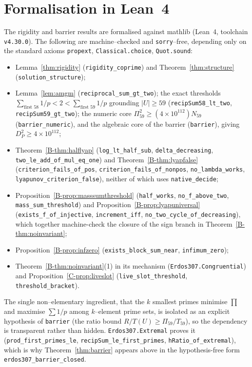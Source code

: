\documentclass[11pt]{article}
\theoremstyle{definition}
\begin{document}
\section{Formalisation in Lean~4}\label{sec:lean}

The rigidity and barrier results are formalised against mathlib (Lean~4, toolchain
\texttt{v4.30.0}). The following are machine--checked and \texttt{sorry}--free, depending only on the
standard axioms \texttt{propext}, \texttt{Classical.choice}, \texttt{Quot.sound}:
\begin{itemize}[leftmargin=1.4em]
\item Lemma~\ref{thm:rigidity} (\texttt{rigidity\_coprime}) and Theorem~\ref{thm:structure}
(\texttt{solution\_structure});
\item Lemma~\ref{lem:amgm} (\texttt{reciprocal\_sum\_gt\_two}); the exact thresholds
$\sum_{\text{first }58}1/p<2<\sum_{\text{first }59}1/p$ grounding $|U|\ge59$
(\texttt{recipSum58\_lt\_two}, \texttt{recipSum59\_gt\_two}); the numeric core
$\Pi_{59}^2\ge(4\times10^{112})N_{59}$ (\texttt{barrier\_numeric}), and the algebraic core of the
barrier (\texttt{barrier}), giving $D_P^2\ge4\times10^{112}$;
\item Theorem~\ref{B-thm:halflyap} (\texttt{log\_lt\_half\_sub}, \texttt{delta\_decreasing},
\texttt{two\_le\_add\_of\_mul\_eq\_one}) and Theorem~\ref{B-thm:lyapfalse}
(\texttt{criterion\_fails\_of\_pos}, \texttt{criterion\_fails\_of\_nonpos},
\texttt{no\_lambda\_works}, \texttt{lyapunov\_criterion\_false}), neither of which uses
\texttt{native\_decide};
\item Proposition~\ref{B-prop:masssumthreshold} (\texttt{half\_works}, \texttt{no\_f\_above\_two},
\texttt{mass\_sum\_threshold}) and Proposition~\ref{B-prop:lyapuniversal}
(\texttt{exists\_f\_of\_injective}, \texttt{increment\_iff},
\texttt{no\_two\_cycle\_of\_decreasing}), which together machine-check the closure of the sign
branch in Theorem~\ref{B-thm:noinvariant};
\item Proposition~\ref{B-prop:infzero} (\texttt{exists\_block\_sum\_near}, \texttt{infimum\_zero});
\item Theorem~\ref{B-thm:noinvariant}(1) in its mechanism (\texttt{Erdos307.Congruential}) and
Proposition~\ref{C-prop:liveslot} (\texttt{live\_slot\_threshold}, \texttt{threshold\_bracket}).
\end{itemize}
The single non--elementary ingredient, that the $k$ smallest primes minimise $\prod$ and maximise
$\sum1/p$ among $k$--element prime sets, is isolated as an explicit hypothesis of \texttt{barrier}
(the ratio bound $R/T(U)\ge\Pi_{59}/T_{59}$), so the dependency is transparent rather than hidden.
\texttt{Erdos307.Extremal} proves it
(\texttt{prod\_first\_primes\_le}, \texttt{recipSum\_le\_first\_primes},
\texttt{hRatio\_of\_extremal}), which is why Theorem~\ref{thm:barrier} appears above in the
hypothesis-free form \texttt{erdos307\_barrier\_closed}.
\end{document}
